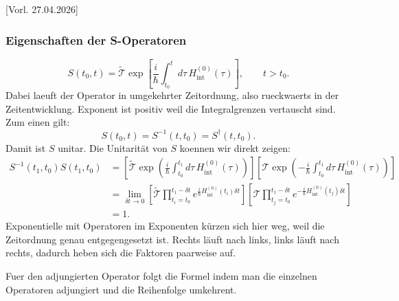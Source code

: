 [Vorl. 27.04.2026]

\subsubsection*{Eigenschaften der S-Operatoren}

\begin{equation}
  S(t_0,t)=\tilde{\mathcal T}\exp\!\left[\frac{i}{\hbar}\int_{t_0}^{t}d\tau\,H_{\mathrm{int}}^{(0)}(\tau)\right],
  \qquad t>t_0.
\end{equation}
Dabei laeuft der Operator in umgekehrter Zeitordnung, also rueckwaerts in der Zeitentwicklung. Exponent ist positiv weil die Integralgrenzen vertauscht sind.
Zum einen gilt:
\begin{equation}
  S(t_0,t)=S^{-1}(t,t_0)=S^{\dagger}(t,t_0).
\end{equation}
Damit ist $S$ unitar. Die Unitarität von $S$ koennen wir direkt zeigen:
\begin{equation}
  \begin{aligned}
    S^{-1}(t_1,t_0)S(t_1,t_0)
     & = \left[\tilde{\mathcal T}\exp\!\left(\frac{i}{\hbar}\int_{t_0}^{t_1}d\tau\,H_{\mathrm{int}}^{(0)}(\tau)\right)\right]
    \left[\mathcal T\exp\!\left(-\frac{i}{\hbar}\int_{t_0}^{t_1}d\tau\,H_{\mathrm{int}}^{(0)}(\tau)\right)\right]             \\
     & = \lim_{\delta t\to 0}
    \left[\tilde{\mathcal T}\prod_{t_i=t_0}^{t_1-\delta t}e^{\frac{i}{\hbar}H_{\mathrm{int}}^{(0)}(t_i)\delta t}\right]
    \left[\mathcal T\prod_{t_j=t_0}^{t_1-\delta t}e^{-\frac{i}{\hbar}H_{\mathrm{int}}^{(0)}(t_j)\delta t}\right]              \\
     & = 1.
  \end{aligned}
\end{equation}
Exponentielle mit Operatoren im Exponenten kürzen sich hier weg, weil die Zeitordnung genau entgegengesetzt ist.
Rechts läuft nach links, links läuft nach rechts, dadurch heben sich die Faktoren paarweise auf.

Fuer den adjungierten Operator folgt die Formel
indem man die einzelnen Operatoren adjungiert und
die Reihenfolge umkehrent.


